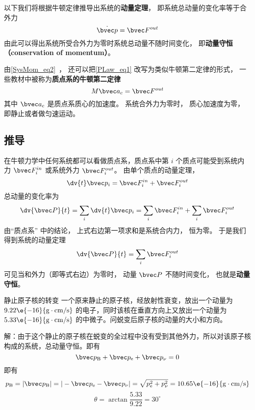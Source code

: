 
以下我们将根据牛顿定律推导出系统的\textbf{动量定理}， 即系统总动量的变化率等于合外力
\begin{equation}\label{PLaw_eq1}
\dot {\bvec p} = \bvec F^{out}
\end{equation}
由此可以得出系统所受合外力为零时系统总动量不随时间变化， 即\textbf{动量守恒（conservation of momentum）}。

由\autoref{SysMom_eq2}~， 还可以把\autoref{PLaw_eq1} 改写为类似牛顿第二定律的形式， 一些教材中被称为\textbf{质点系的牛顿第二定律}
\begin{equation}\label{PLaw_eq2}
M \bvec a_c = \bvec F^{out}
\end{equation}
其中 $\bvec a_c$ 是质点系质心的加速度。 系统合外力为零时， 质心加速度为零， 即静止或者做匀速运动。

\subsection{推导}
在牛顿力学中任何系统都可以看做质点系，质点系中第 $i$ 个质点可能受到系统内力 $\bvec F_i^{in}$ 或系统外力 $\bvec F_i^{out}$。 由单个质点的动量定理，
\begin{equation}
\dv{t} \bvec p_i = \bvec F_i^{in} + \bvec F_i^{out}
\end{equation}
总动量的变化率为
\begin{equation}
\dv{\bvec P}{t} = \sum_i \dv{t} \bvec p_i  = \sum_i \bvec F_i^{in}  + \sum_i \bvec F_i^{out}
\end{equation}
由“质点系” 中的结论， 上式右边第一项求和是系统合内力， 恒为零。 于是我们得到系统的动量定理
\begin{equation}
\dv{\bvec P}{t} = \sum_i \bvec F_i^{out}
\end{equation}
可见当和外力（即等式右边）为零时， 动量 $\bvec P$ 不随时间变化， 也就是\textbf{动量守恒}。

\begin{example}{静止原子核的转变}
一个原来静止的原子核，经放射性衰变，放出一个动量为 $9.22\e{-16}{\rm g\cdot cm/s}$ 的电子，同时该核在垂直方向上又放出一个动量为 $5.33\e{-16}{\rm g\cdot cm/s}$ 的中微子。问蜕变后原子核的动量的大小和方向。

解：由于这个静止的原子核在蜕变的全过程中没有受到其他外力，所以对该原子核构成的系统，总动量守恒。即有
\begin{equation}
\bvec p_{\rm B}+\bvec p_{\rm e}+\bvec p_{\rm \nu}=0
\end{equation}
即有
\begin{equation}
p_{\rm B}=|\bvec p_{\rm B}|=|-\bvec p_{\rm e}-\bvec p_{\rm \nu}|=\sqrt{p_{\rm e}^{2}+p_{\rm \nu}^{2}}=10.65\e{-16}{\rm g\cdot cm/s}
\end{equation}
\begin{equation}
\theta=\arctan\frac{5.33}{9.22}=30^\circ
\end{equation}
\end{example}
